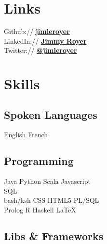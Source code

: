 \documentclass[letterpaper]{deedy-resume} %
\begin{document}
\begin{minipage}[t]{0.33\textwidth} %


\section{Links} 

Github:// \href{https://github.com/jimleroyer/}{\bf jimleroyer} \\
LinkedIn:// \href{https://ca.linkedin.com/in/jimleroyer/}{\bf Jimmy Royer} \\
Twitter:// \href{https://twitter.com/jimleroyer}{\bf @jimleroyer} \\



\section{Skills}

\subsection{Spoken Languages}

English \textbullet{} French

\sectionspace %

\subsection{Programming}

Java \textbullet{} Python \textbullet{} Scala \textbullet{} Javascript \\
SQL \\
bash/ksh \textbullet{} CSS \textbullet{} HTML5 \textbullet{} PL/SQL \\
Prolog \textbullet{} R \textbullet{} Haskell \textbullet{} \LaTeX\

\sectionspace %

\subsection{Libs \& Frameworks}


\end{minipage}
\end{document}
